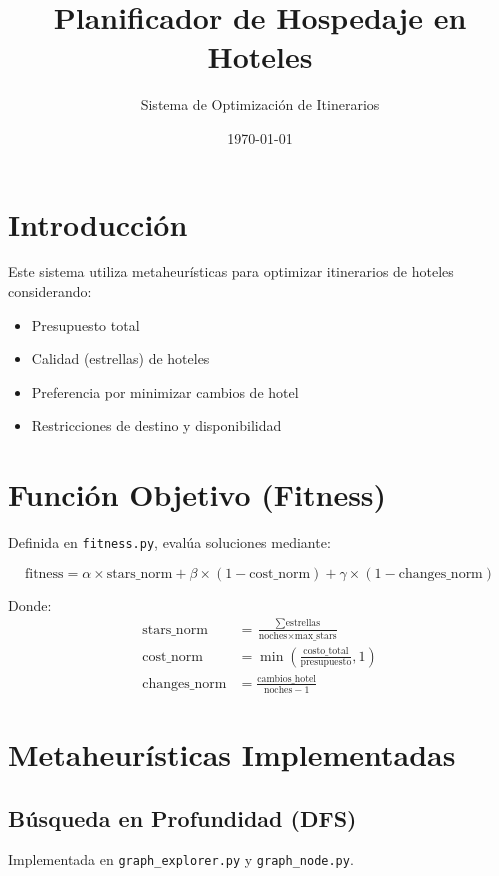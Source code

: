 \documentclass{article}
\title{Planificador de Hospedaje en Hoteles}
\author{Sistema de Optimización de Itinerarios}
\date{\today}
\begin{document}
\maketitle

\section{Introducción}
Este sistema utiliza metaheurísticas para optimizar itinerarios de hoteles considerando:
\begin{itemize}
    \item Presupuesto total
    \item Calidad (estrellas) de hoteles
    \item Preferencia por minimizar cambios de hotel
    \item Restricciones de destino y disponibilidad
\end{itemize}

\section{Función Objetivo (Fitness)}
\label{sec:fitness}
Definida en \texttt{fitness.py}, evalúa soluciones mediante:

\begin{equation}
\text{fitness} = \alpha \times \text{stars\_norm} + \beta \times (1 - \text{cost\_norm}) + \gamma \times (1 - \text{changes\_norm})
\end{equation}

Donde:
\begin{align*}
\text{stars\_norm} &= \frac{\sum \text{estrellas}}{\text{noches} \times \text{max\_stars}} \\
\text{cost\_norm} &= \min\left(\frac{\text{costo\_total}}{\text{presupuesto}}, 1\right) \\
\text{changes\_norm} &= \frac{\text{cambios\_hotel}}{\text{noches} - 1}
\end{align*}

\section{Metaheurísticas Implementadas}

\subsection{Búsqueda en Profundidad (DFS)}
\label{subsec:dfs}
Implementada en \texttt{graph\_explorer.py} y \texttt{graph\_node.py}.
\end{document}

